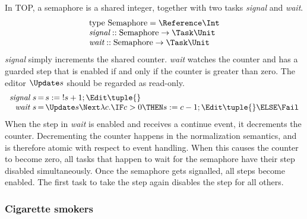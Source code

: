 In TOP, a semaphore is a shared integer, together with two tasks \emph{signal} and \emph{wait}.
\begin{equation*}
  \begin{array}{l}
  \text{type}\ \text{Semaphore} = \Reference \Int \\
  \textit{signal} :: \text{Semaphore} \to \Task \Unit \\
  \textit{wait}   :: \text{Semaphore} \to \Task \Unit
  \end{array}
\end{equation*}
\emph{signal} simply increments the shared counter.
\emph{wait} watches the counter and has a guarded step that is enabled if and only if the counter is greater than zero.
The editor $\Update s$ should be regarded as read-only.
\begin{equation*}
  \begin{array}{r @{\,} c @{\,} l}
    \textit{signal}\ s & = & s := {!s} + 1; \Edit \tuple{} \\
    \textit{wait}\ s   & = & \Update s \Next \lambda c. \IF c > 0 \THEN s := c - 1; \Edit \tuple{} \ELSE \Fail
  \end{array}
\end{equation*}
When the step in \emph{wait} is enabled and receives a continue event, it decrements the counter.
Decrementing the counter happens in the normalization semantics, and is therefore atomic with respect to event handling.
When this causes the counter to become zero, all tasks that happen to wait for the semaphore have their step disabled simultaneously.
Once the semaphore gets signalled, all steps become enabled.
The first task to take the step again disables the step for all others.



\subsubsection*{Cigarette smokers}
